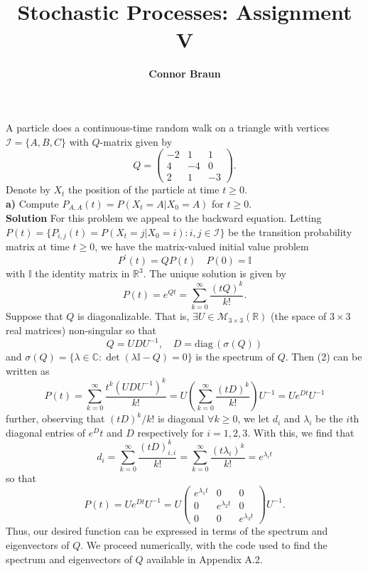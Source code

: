 \documentclass[11pt, letterpaper]{article}
\title{\bf Stochastic Processes: Assignment V}
\author{\bf Connor Braun}
\date{}
\newcommand{\mbb}[1]{\mathbb{#1}}
\newcommand{\mc}[1]{\mathcal{#1}}
\begin{document}
    \maketitle
     A particle does a continuous-time random walk on a triangle with vertices $\mc{I}=\{A,B,C\}$ with $Q$-matrix given by
    \[Q=\begin{pmatrix}
        -2 & 1 & 1\\
        4 & -4 & 0\\
        2 & 1 & -3
    \end{pmatrix}.\]
    Denote by $X_t$ the position of the particle at time $t\geq 0$.\\[10pt]
    {\bf a)} Compute $P_{A,A}(t)=P(X_t=A|X_0=A)$ for $t\geq 0$.\\[10pt]
    {\bf Solution} For this problem we appeal to the backward equation. Letting $P(t)=\{P_{i,j}(t)=P(X_t=j|X_0=i):i,j\in\mc{I}\}$ be the transition probability matrix at time $t\geq 0$, we have the matrix-valued initial value problem 
    \[P^\prime(t)=QP(t)\quad P(0)=\mbb{I}\]
    with $\mbb{I}$ the identity matrix in $\mbb{R}^3$. The unique solution is given by
    \[P(t)=e^{Qt}=\sum_{k=0}^\infty\frac{(tQ)^k}{k!}.\tag{2}\]
    Suppose that $Q$ is diagonalizable. That is, $\exists U\in \mc{M}_{3\times 3}(\mbb{R})$ (the space of $3\times 3$ real matrices) non-singular so that
    \[Q=UDU^{-1},\quad D=\text{diag}\,(\sigma(Q))\]
    and $\sigma(Q)=\{\lambda\in\mbb{C}:\det(\lambda\mbb{I}-Q)=0\}$ is the spectrum of $Q$. Then (2) can be written as
    \[P(t)=\sum_{k=0}^\infty\frac{t^k(UDU^{-1})^k}{k!}=U\left(\sum_{k=0}^\infty\frac{(tD)^k}{k!}\right)U^{-1}=Ue^{Dt}U^{-1}\]
    further, observing that $(tD)^k/k!$ is diagonal $\forall k\geq 0$, we let $d_i$ and $\lambda_i$ be the $i$th diagonal entries of $e^Dt$ and $D$ respectively for $i=1,2,3$. With this, we find that 
    \[d_i=\sum_{k=0}^\infty\frac{(tD)^k_{i,i}}{k!}=\sum_{k=0}^\infty\frac{(t\lambda_i)^k}{k!}=e^{\lambda_it}\]
    so that
    \[P(t)=Ue^{Dt}U^{-1}=U\begin{pmatrix}
        e^{\lambda_1t} & 0 & 0\\
        0 & e^{\lambda_2 t} & 0\\
        0 & 0 & e^{\lambda_3 t}
    \end{pmatrix}U^{-1}.\]
    Thus, our desired function can be expressed in terms of the spectrum and eigenvectors of $Q$. We proceed numerically, with the code used to find the spectrum and eigenvectors of $Q$ available in Appendix A.2.\\[10pt]
\end{document}
